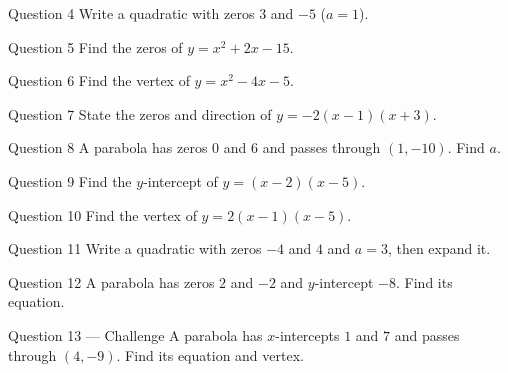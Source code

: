 \documentclass[11pt]{article}
\begin{document}
\begin{qbox}{Question 4}
Write a quadratic with zeros $3$ and $-5$ ($a=1$).\workspace{1.8cm}
\end{qbox}

\begin{qbox}{Question 5}
Find the zeros of $y=x^2+2x-15$.\workspace{2.0cm}
\end{qbox}

\begin{qbox}{Question 6}
Find the vertex of $y=x^2-4x-5$.\workspace{2.4cm}
\end{qbox}

\begin{qbox}{Question 7}
State the zeros and direction of $y=-2(x-1)(x+3)$.\workspace{2.0cm}
\end{qbox}

\begin{qbox}{Question 8}
A parabola has zeros $0$ and $6$ and passes through $(1,-10)$. Find $a$.\workspace{2.4cm}
\end{qbox}

\begin{qbox}{Question 9}
Find the $y$-intercept of $y=(x-2)(x-5)$.\workspace{1.8cm}
\end{qbox}

\begin{qbox}{Question 10}
Find the vertex of $y=2(x-1)(x-5)$.\workspace{2.4cm}
\end{qbox}

\begin{qbox}{Question 11}
Write a quadratic with zeros $-4$ and $4$ and $a=3$, then expand it.\workspace{2.2cm}
\end{qbox}

\begin{qbox}{Question 12}
A parabola has zeros $2$ and $-2$ and $y$-intercept $-8$. Find its equation.\workspace{2.4cm}
\end{qbox}

\begin{qbox}{Question 13 --- Challenge}
A parabola has $x$-intercepts $1$ and $7$ and passes through $(4,-9)$. Find its equation and vertex.\workspace{3.2cm}
\end{qbox}

\clearpage
{}
\end{document}
